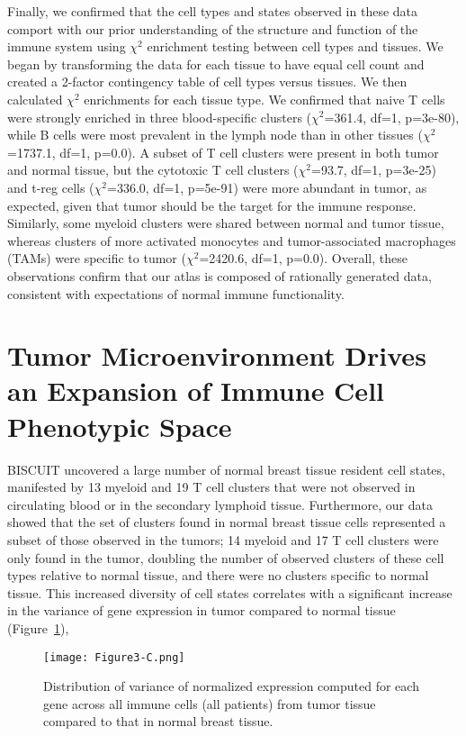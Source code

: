 Finally, we confirmed that the cell types and states observed in these data comport with our prior understanding of the structure and function of the immune system using $\chi^2$ enrichment testing between cell types and tissues.
We began by transforming the data for each tissue to have equal cell count and created a 2-factor contingency table of cell types versus tissues.
We then calculated \(\chi^{2}\) enrichments for each tissue type. 
We confirmed that naive T cells were strongly enriched in three blood-specific clusters (\(\chi^{2}\)=361.4, df=1, p=3e-80), while B cells were most prevalent in the lymph node than in other tissues (\(\chi^{2}\)=1737.1, df=1, p=0.0).
A subset of T cell clusters were present in both tumor and normal tissue, but the cytotoxic T cell clusters (\(\chi^{2}\)=93.7, df=1, p=3e-25) and t-reg cells (\(\chi^{2}\)=336.0, df=1, p=5e-91) were more abundant in tumor, as expected, given that tumor should be the target for the immune response.
Similarly, some myeloid clusters were shared between normal and tumor tissue, whereas clusters of more activated monocytes and tumor-associated macrophages (TAMs) were specific to tumor (\(\chi^{2}\)=2420.6, df=1, p=0.0).
Overall, these observations confirm that our atlas is composed of rationally generated data, consistent with expectations of normal immune functionality. 

\section{Tumor Microenvironment Drives an Expansion of Immune Cell Phenotypic Space}

BISCUIT uncovered a large number of normal breast tissue resident cell states, manifested by 13 myeloid and 19 T cell clusters that were not observed in circulating blood or in the secondary lymphoid tissue.
Furthermore, our data showed that the set of clusters found in normal breast tissue cells represented a subset of those observed in the tumors; 14 myeloid and 17 T cell clusters were only found in the tumor, doubling the number of observed clusters of these cell types relative to normal tissue, and there were no clusters specific to normal tissue.
This increased diversity of cell states correlates with a significant increase in the variance of gene expression in tumor compared to normal tissue (Figure~\ref{fig:3c}),

\begin{figure}
\centering
\texttt{[image: Figure3-C.png]}
\caption{Distribution of variance of normalized expression computed for each gene across all immune cells (all patients) from tumor tissue compared to that in normal breast tissue.
}
\label{fig:3c}
\end{figure}

